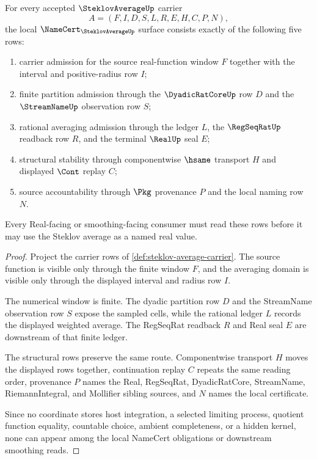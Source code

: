 \begin{theorem}
\label{thm:steklov-average-namecert-obligations}
For every accepted $\SteklovAverageUp$ carrier
$$
A=(F,I,D,S,L,R,E,H,C,P,N),
$$
the local $\NameCert_{\SteklovAverageUp}$ surface consists exactly of the following five rows:
\begin{enumerate}
\item carrier admission for the source real-function window $F$ together with the interval and positive-radius row $I$;
\item finite partition admission through the $\DyadicRatCoreUp$ row $D$ and the $\StreamNameUp$ observation row $S$;
\item rational averaging admission through the ledger $L$, the $\RegSeqRatUp$ readback row $R$, and the terminal $\RealUp$ seal $E$;
\item structural stability through componentwise $\hsame$ transport $H$ and displayed $\Cont$ replay $C$;
\item source accountability through $\Pkg$ provenance $P$ and the local naming row $N$.
\end{enumerate}
Every Real-facing or smoothing-facing consumer must read these rows before it may use the Steklov average as a named real value.
\end{theorem}
\begin{proof}
Project the carrier rows of \autoref{def:steklov-average-carrier}. The source function is visible only through the finite window $F$, and the averaging domain is visible only through the displayed interval and radius row $I$.

The numerical window is finite. The dyadic partition row $D$ and the StreamName observation row $S$ expose the sampled cells, while the rational ledger $L$ records the displayed weighted average. The RegSeqRat readback $R$ and Real seal $E$ are downstream of that finite ledger.

The structural rows preserve the same route. Componentwise transport $H$ moves the displayed rows together, continuation replay $C$ repeats the same reading order, provenance $P$ names the Real, RegSeqRat, DyadicRatCore, StreamName, RiemannIntegral, and Mollifier sibling sources, and $N$ names the local certificate.

Since no coordinate stores host integration, a selected limiting process, quotient function equality, countable choice, ambient completeness, or a hidden kernel, none can appear among the local NameCert obligations or downstream smoothing reads.
\end{proof}

